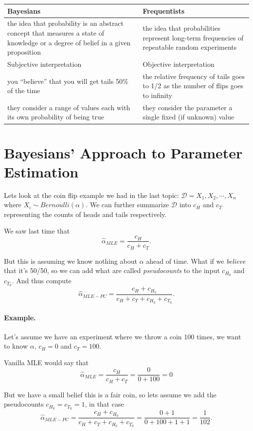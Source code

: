 \begin{tabularx}{\textwidth}{XX}
\hline
Bayesians & Frequentists\\
\hline\hline
the idea that probability is an abstract concept that measures a state of knowledge or a degree of belief in a given proposition &
the idea that probabilities represent long-term frequencies of repeatable random experiments\\
\hline
Subjective interpretation
& Objective interpretation\\
\hline
you ``believe'' that you will get tails 50\% of the time & 
the relative frequency of tails goes to 1/2 as the number of flips goes to infinity\\
they consider a range of values each with its own probability of being true& they consider the parameter a single fixed (if unknown) value\\
\end{tabularx}

\section{Bayesians' Approach to Parameter Estimation}
Lets look at the coin flip example we had in the last topic: 
 $\mathcal{D} = X_1, X_2, \cdots, X_n$ 
where $X_i \sim Bernoulli(\alpha)$.
We can further summarize $\mathcal{D}$ into $c_H$ and $c_T$ 
representing the counts of heads and tails respectively. 

We saw last time that \[\hat\alpha_{MLE} = \frac{c_H}{c_H+c_T}.\]

But this is assuming we know nothing about $\alpha$ ahead of time. 
What if we \textit{believe} that it's 50/50, so we can add what are called \emph{pseudocounts}
to the input $c_{H_0}$ and $c_{T_0}$.
And thus compute 
\[\hat\alpha_{MLE-PC} = \frac{c_H+c_{H_0}}{c_H+c_T+c_{H_0}+c_{T_0}}.\]

\paragraph{Example. }
Let's assume we have an experiment where we throw a coin 100 times, we want to know $\alpha$, $c_H=0$ and $c_T=100$.

Vanilla MLE would say that 
\[\hat\alpha_{MLE} = \frac{c_H}{c_H+c_T} = \frac{0}{0 + 100} = 0\]
  
But we have a small belief this is a fair coin, so lets assume we add the pseudocounts $c_{H_0}=c_{T_0}=1$, 
in that case 
\[\hat\alpha_{MLE-PC} = \frac{c_H+c_{H_0}}{c_H+c_T+c_{H_0}+c_{T_0}}=\frac{0+1}{0+100+1+1} = \frac{1}{102}.\]

